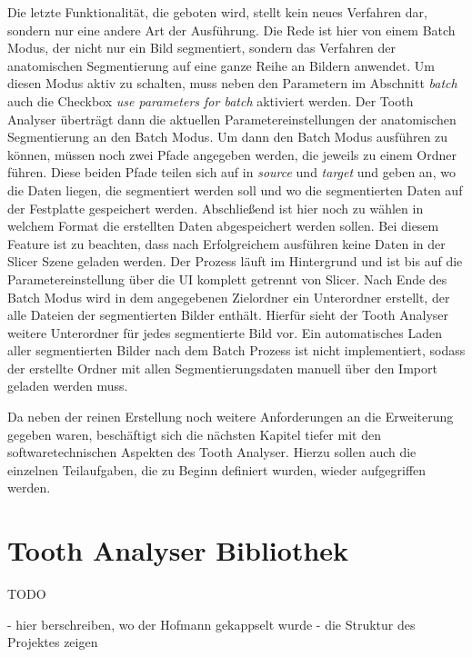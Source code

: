Die letzte Funktionalität, die geboten wird, stellt kein neues Verfahren dar, sondern
nur eine andere Art der Ausführung. Die Rede ist hier von einem Batch Modus, der
nicht nur ein Bild segmentiert, sondern das Verfahren der anatomischen
Segmentierung auf eine ganze Reihe an Bildern anwendet. Um diesen Modus aktiv zu
schalten, muss neben den Parametern im Abschnitt \textit{batch} auch die Checkbox
\textit{use parameters for batch} aktiviert werden. Der Tooth Analyser überträgt
dann die aktuellen Parametereinstellungen der anatomischen Segmentierung an den Batch
Modus. Um dann den Batch Modus ausführen zu können, müssen noch zwei Pfade angegeben
werden, die jeweils zu einem Ordner führen. Diese beiden Pfade teilen sich auf in
\textit{source} und \textit{target} und geben an, wo die Daten liegen, die segmentiert
werden soll und wo die segmentierten Daten auf der Festplatte gespeichert werden.
Abschließend ist hier noch zu wählen in welchem Format die erstellten Daten
abgespeichert werden sollen. Bei diesem Feature ist zu beachten, dass nach
Erfolgreichem ausführen keine Daten in der Slicer Szene geladen werden. Der Prozess
läuft im Hintergrund und ist bis auf die Parametereinstellung über die UI komplett
getrennt von Slicer. Nach Ende des Batch Modus wird in dem angegebenen
Zielordner ein Unterordner erstellt, der alle Dateien der segmentierten Bilder enthält.
Hierfür sieht der Tooth Analyser weitere Unterordner für jedes segmentierte Bild
vor. Ein automatisches Laden aller segmentierten Bilder nach dem Batch Prozess ist
nicht implementiert, sodass der erstellte Ordner mit allen Segmentierungsdaten
manuell über den Import geladen werden muss.

Da neben der reinen Erstellung noch weitere Anforderungen an die Erweiterung
gegeben waren, beschäftigt sich die nächsten Kapitel tiefer mit den softwaretechnischen
Aspekten des Tooth Analyser. Hierzu sollen auch die einzelnen Teilaufgaben, die zu
Beginn definiert wurden, wieder aufgegriffen werden.

\section{Tooth Analyser Bibliothek}
TODO

- hier berschreiben, wo der Hofmann gekappselt wurde - die Struktur des
Projektes zeigen

